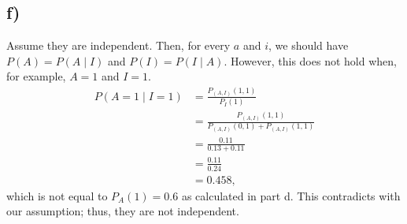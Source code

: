 \documentclass[12pt]{article}
\begin{document}
\subsection*{f)}
Assume they are independent. Then, for every $a$ and $i$, we should have $P(A) = P(A \mid I)$ and $P(I) = P(I \mid A)$. However, this does not hold when, for example, $A = 1$ and $I = 1$.
\begin{align*}
    P(A = 1 \mid I = 1) &= \frac{P_{(A, I)}(1, 1)}{P_{I}(1)} \\
    &= \frac{P_{(A, I)}(1, 1)}{P_{(A, I)}(0, 1) + P_{(A, I)}(1, 1)} \\
    &= \frac{0.11}{0.13 + 0.11} \\
    &= \frac{0.11}{0.24} \\
    &= 0.458,
\end{align*}
which is not equal to $P_{A}(1) = 0.6$ as calculated in part d. This contradicts with our assumption; thus, they are not independent.
\end{document}
